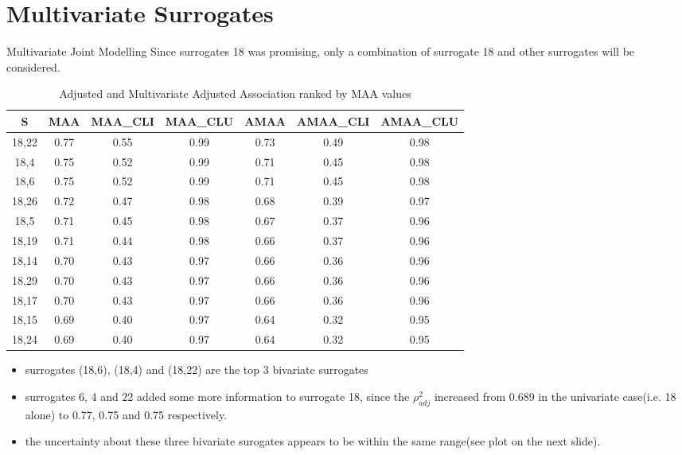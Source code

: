 \documentclass[a4paper,9pt]{beamer}\usepackage[]{graphicx}\usepackage[]{color}
\begin{document}
\section{Multivariate Surrogates}

\begin{frame}{Multivariate Joint Modelling}
\tiny
Since surrogates 18 was promising, only a combination of surrogate 18 and other surrogates will be considered.
\begin{table}[H]
\centering
\begin{tabular}{ccccccc}
  \hline
S & MAA & MAA\_CLI & MAA\_CLU & AMAA & AMAA\_CLI & AMAA\_CLU \\ 
  \hline
\alert{18,22} & 0.77 & 0.55 & 0.99 & 0.73 & 0.49 & 0.98 \\ 
  \alert{18,4} & 0.75 & 0.52 & 0.99 & 0.71 & 0.45 & 0.98 \\ 
  \alert{18,6} & 0.75 & 0.52 & 0.99 & 0.71 & 0.45 & 0.98 \\ 
  18,26 & 0.72 & 0.47 & 0.98 & 0.68 & 0.39 & 0.97 \\ 
  \alert{18,5} & 0.71 & 0.45 & 0.98 & 0.67 & 0.37 & 0.96 \\ 
  18,19 & 0.71 & 0.44 & 0.98 & 0.66 & 0.37 & 0.96 \\ 
  18,14 & 0.70 & 0.43 & 0.97 & 0.66 & 0.36 & 0.96 \\ 
  18,29 & 0.70 & 0.43 & 0.97 & 0.66 & 0.36 & 0.96 \\ 
  18,17 & 0.70 & 0.43 & 0.97 & 0.66 & 0.36 & 0.96 \\ 
  18,15 & 0.69 & 0.40 & 0.97 & 0.64 & 0.32 & 0.95 \\ 
  18,24 & 0.69 & 0.40 & 0.97 & 0.64 & 0.32 & 0.95 \\ 
   \hline
\end{tabular}
\caption{Adjusted and Multivariate Adjusted Association ranked by MAA values}
\end{table}
\tiny
\begin{itemize}
\item surrogates (18,6), (18,4) and (18,22) are the top 3 bivariate surrogates
\item surrogates 6, 4 and 22 added some more information to surrogate 18, since the $\rho^2_{adj}$ increased from 0.689 in the univariate case(i.e. 18 alone) to 0.77, 0.75 and 0.75 respectively.
\item the uncertainty about these three bivariate surogates appears to be within the same range(see plot on the next slide).

\end{itemize}

\end{frame}
\end{document}
